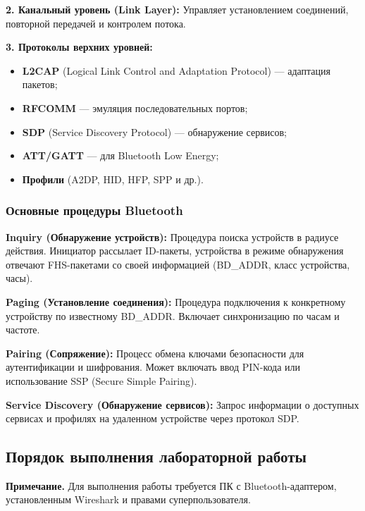 \textbf{2. Канальный уровень (Link Layer):}
Управляет установлением соединений, повторной передачей и контролем потока.

\textbf{3. Протоколы верхних уровней:}
\begin{itemize}[nosep]
    \item \textbf{L2CAP} (Logical Link Control and Adaptation Protocol) — адаптация пакетов;
    \item \textbf{RFCOMM} — эмуляция последовательных портов;
    \item \textbf{SDP} (Service Discovery Protocol) — обнаружение сервисов;
    \item \textbf{ATT/GATT} — для Bluetooth Low Energy;
    \item \textbf{Профили} (A2DP, HID, HFP, SPP и др.).
\end{itemize}

\subsubsection{Основные процедуры Bluetooth}

\textbf{Inquiry (Обнаружение устройств):}
Процедура поиска устройств в радиусе действия. Инициатор рассылает ID-пакеты, устройства в режиме обнаружения отвечают FHS-пакетами со своей информацией (BD\_ADDR, класс устройства, часы).

\textbf{Paging (Установление соединения):}
Процедура подключения к конкретному устройству по известному BD\_ADDR. Включает синхронизацию по часам и частоте.

\textbf{Pairing (Сопряжение):}
Процесс обмена ключами безопасности для аутентификации и шифрования. Может включать ввод PIN-кода или использование SSP (Secure Simple Pairing).

\textbf{Service Discovery (Обнаружение сервисов):}
Запрос информации о доступных сервисах и профилях на удаленном устройстве через протокол SDP.

\subsection{Порядок выполнения лабораторной работы}

\textbf{Примечание.} Для выполнения работы требуется ПК с Bluetooth-адаптером, установленным Wireshark и правами суперпользователя.

